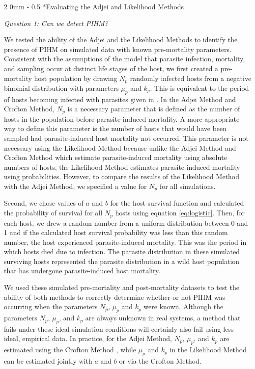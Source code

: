 \documentclass[12pt, a4paper]{article}
\makeatletter
\renewcommand{\subsection}{\@startsection
{subsection}%
{2}%
{0mm}%
{-\baselineskip}%
{0.5\baselineskip}%
{\normalfont\bf}} %
\makeatother
\begin{document}
\subsection*{Evaluating the Adjei and Likelihood Methods}

\emph{Question 1: Can we detect PIHM?}

We tested the ability of the Adjei and the Likelihood Methods to identify the presence of PIHM on simulated data with known pre-mortality parameters. Consistent with the assumptions of the model that parasite infection, mortality, and sampling occur at distinct life stages of the host, we first created a pre-mortality host population by drawing $N_p$ randomly infected hosts from a
negative binomial distribution with parameters $\mu_p$ and $k_p$. This is equivalent to the period of hosts becoming infected with parasites given in \cite{Adjei1986}.  In the Adjei Method and Crofton Method, $N_p$ is a necessary parameter that is defined as the number of hosts in the population before parasite-induced mortality.  A more appropriate way to define this parameter is the number of hosts that would have been sampled had parasite-induced host mortality not occurred.  This parameter is not necessary using the Likelihood Method because unlike the Adjei Method and Crofton Method which estimate parasite-induced mortality using absolute numbers of hosts, the Likelihood Method estimates parasite-induced mortality using probabilities. However, to compare the results of the Likelihood Method with the Adjei Method, we specified a value for $N_p$ for all simulations.

Second, we chose values of $a$ and $b$ for the host survival function and calculated the probability of survival
for all $N_p$ hosts using equation \ref{eq:logistic}.  Then, for each host, we drew a random number from a uniform distribution
between 0 and 1 and if the calculated host survival probability was less than this random
number, the host experienced parasite-induced mortality.  This was the period in which hosts died due to infection. The parasite distribution in these simulated surviving hosts represented the parasite distribution in a wild host population that has undergone parasite-induced host mortality.

We used these simulated pre-mortality and post-mortality datasets to test the
ability of both methods to correctly determine whether or not PIHM was
occurring when the parameters $N_p$, $\mu_p$ and $k_p$ were known.  Although
the parameters $N_p$, $\mu_p$, and $k_p$ are always unknown in real systems, a
method that fails under these ideal simulation conditions will certainly also
fail using less ideal, empirical data. In practice, for the Adjei Method, $N_p$, $\mu_p$,
and $k_p$ are estimated using the Crofton Method \citep{Adjei1986}, while $\mu_p$ and $k_p$ in
the Likelihood Method can be estimated jointly with $a$ and $b$ or via the
Crofton Method.
\end{document}
